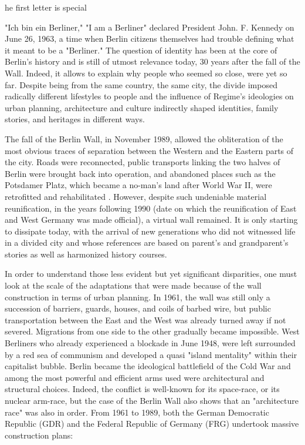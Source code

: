 \label{ch:a-quest-for-identity-in-berlin}

he first letter is special



   "Ich bin ein Berliner," "I am a Berliner" declared President John. F.
   Kennedy on June 26, 1963, a time when Berlin citizens themselves had
   trouble defining what it meant to be a "Berliner." The question of
   identity has been at the core of Berlin's history and is still of
   utmost relevance today, 30 years after the fall of the Wall.  Indeed,
   it allows to explain why people who seemed so close, were yet so far.
   Despite being from the same country, the same city, the divide imposed
   radically different lifestyles to people and the influence of Regime's
   ideologies on urban planning, architecture and culture indirectly
   shaped identities, family stories, and heritages in different ways.

   The fall of the Berlin Wall, in November 1989, allowed the obliteration
   of the most obvious traces of separation between the Western and the
   Eastern parts of the city. Roads were reconnected, public transports
   linking the two halves of Berlin were brought back into operation, and
   abandoned places such as the Potsdamer Platz, which became a no-man's
   land after World War II, were retrofitted and rehabilitated . However,
   despite such undeniable material reunification, in the years following
   1990 (date on which the reunification of East and West Germany was made
   official), a virtual wall remained. It is only starting to dissipate
   today, with the arrival of new generations who did not witnessed life
   in a divided city and whose references are based on parent's and
   grandparent's stories as well as harmonized history courses.

   In order to understand those less evident but yet significant
   disparities, one must look at the scale of the adaptations that were
   made because of the wall construction in terms of urban planning. In
   1961, the wall was still only a succession of barriers, guards, houses,
   and coils of barbed wire, but public transportation between the East
   and the West was already turned away if not severed. Migrations from
   one side to the other gradually became impossible. West Berliners who
   already experienced a blockade in June 1948, were left surrounded by a
   red sea of communism and developed a quasi "island mentality" within
   their capitalist bubble. Berlin became the ideological battlefield of
   the Cold War and among the most powerful and efficient arms used were
   architectural and structural choices. Indeed, the conflict is
   well-known for its space-race, or its nuclear arm-race, but the case of
   the Berlin Wall  also shows that an "architecture race" was also in
   order. From 1961 to 1989, both the German Democratic Republic (GDR) and
   the Federal Republic of Germany (FRG) undertook massive construction
   plans:

